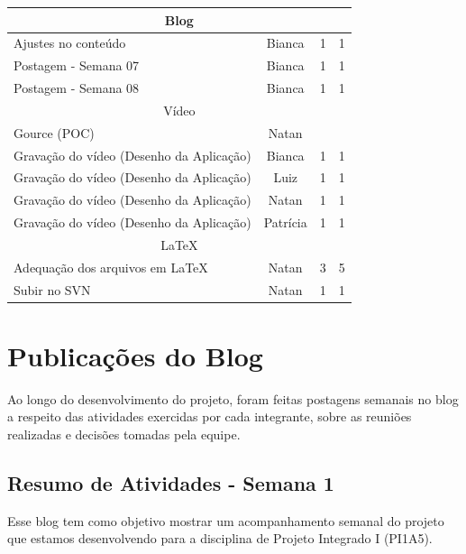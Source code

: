 \begin{apendicesenv}
\begin{quadro}[htb]
\begin{tabular}{|l|c|c|c|}
    \multicolumn{4}{|c|}{Blog} \\ \hline
    Ajustes no conteúdo  & Bianca    & 1  & 1    \\ \hline
    Postagem - Semana 07      & Bianca    & 1  & 1    \\ \hline
    Postagem - Semana 08      & Bianca     & 1 & 1   \\ \hline
    
    \multicolumn{4}{|c|}{Vídeo} \\ \hline
    Gource (POC) & Natan &   &    \\ \hline 
    Gravação do vídeo (Desenho da Aplicação) & Bianca & 1 & 1    \\ \hline
    Gravação do vídeo (Desenho da Aplicação) & Luiz & 1  & 1    \\ \hline
    Gravação do vídeo (Desenho da Aplicação) & Natan & 1  & 1    \\ \hline
    Gravação do vídeo (Desenho da Aplicação) & Patrícia & 1  & 1    \\ \hline
    
    \multicolumn{4}{|c|}{LaTeX} \\ \hline
    Adequação dos arquivos em LaTeX & Natan & 3 & 5   \\ \hline 
    Subir no SVN & Natan & 1 & 1   \\ \hline
    
\end{tabular}
\end{quadro}
\FloatBarrier

\chapter{Publicações do Blog}

Ao longo do desenvolvimento do projeto, foram feitas postagens semanais no blog a respeito das atividades exercidas por cada integrante, sobre as reuniões realizadas e decisões tomadas pela equipe.

\section{Resumo de Atividades - Semana 1}

Esse blog tem como objetivo mostrar um acompanhamento semanal do projeto que estamos desenvolvendo para a disciplina de Projeto Integrado I (PI1A5).


\end{apendicesenv}
